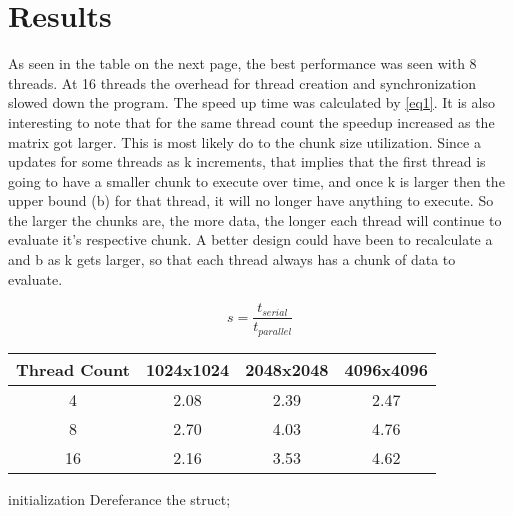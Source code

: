 \documentclass[12pt]{article}
\begin{document}
\pagebreak
\vspace{-0.6cm}
\section{Results}
\vspace{-0.4cm}
\qquad As seen in the table on the next page, the best performance was seen
with 8 threads. At 16 threads the overhead for thread creation and
synchronization slowed down the program. The speed up time was calculated by
\eqref{eq1}. It is also interesting to note that for the same thread count
the speedup increased as the matrix got larger. This is most likely do to
the chunk size utilization. Since a updates for some threads as k
increments, that implies that the first thread is going to have a smaller
chunk to execute over time, and once k is larger then the upper bound (b) 
for that thread, it will no longer have anything to execute. So the larger
the chunks are, the more data, the longer each thread will continue to
evaluate it's respective chunk. A better design could have been to
recalculate a and b as k gets larger, so that each thread always has a chunk
of data to evaluate. 

\begin{equation}
    s = \frac{t_{serial}}{t_{parallel}}\label{eq1}
\end{equation}

\pagebreak

\begin{center}
\hspace*{-2.5cm}
\begin{tabular}{@{}|c|c|c|c|}
\hline
Thread Count & 1024x1024 & 2048x2048 & 4096x4096 \\
\hline
4 & 2.08 & 2.39 & 2.47 \\
\hline
8 & 2.70 & 4.03 & 4.76  \\
\hline 
16 & 2.16 & 3.53 & 4.62 \\
\hline
\end{tabular}
\hspace*{-2.5cm}
\end{center}

\vspace{1cm}
\begin{algorithm}[H]
\SetAlgoLined
{}
initialization\;
Dereferance the struct; 
\end{algorithm}

\end{document}
